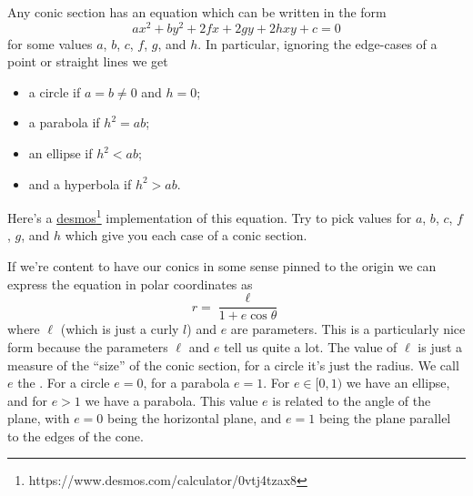 \documentclass[fleqn]{LectureClass/LectureClass}
\begin{document}
    Any conic section has an equation which can be written in the form
    \begin{equation}
        ax^2 + by^2 + 2fx + 2gy + 2hxy + c = 0
    \end{equation}
    for some values \(a\), \(b\), \(c\), \(f\), \(g\), and \(h\).
    In particular, ignoring the edge-cases of a point or straight lines we get
    \begin{itemize}
        \item a circle if \(a = b \ne 0\) and \(h = 0\);
        \item a parabola if \(h^2 = ab\);
        \item an ellipse if \(h^2 < ab\);
        \item and a hyperbola if \(h^2 > ab\).
    \end{itemize}
    
    \begin{problem}{}{}
        Here's a \href{https://www.desmos.com/calculator/0vtj4tzax8}{desmos}\footnote{https://www.desmos.com/calculator/0vtj4tzax8} implementation of this equation.
        Try to pick values for \(a\), \(b\), \(c\), \(f\), \(g\), and \(h\) which give you each case of a conic section.
    \end{problem}
    
    If we're content to have our conics in some sense pinned to the origin we can express the equation in polar coordinates as
    \begin{equation}
        r = \frac{\ell}{1 + e \cos \theta}
    \end{equation}
    where \(\ell\) (which is just a curly \(l\)) and \(e\) are parameters.
    This is a particularly nice form because the parameters \(\ell\) and \(e\) tell us quite a lot.
    The value of \(\ell\) is just a measure of the \enquote{size} of the conic section, for a circle it's just the radius.
    We call \(e\) the .
    For a circle \(e = 0\), for a parabola \(e = 1\).
    For \(e \in [0, 1)\) we have an ellipse, and for \(e > 1\) we have a parabola.
    This value \(e\) is related to the angle of the plane, with \(e = 0\) being the horizontal plane, and \(e = 1\) being the plane parallel to the edges of the cone.
    
\end{document}
